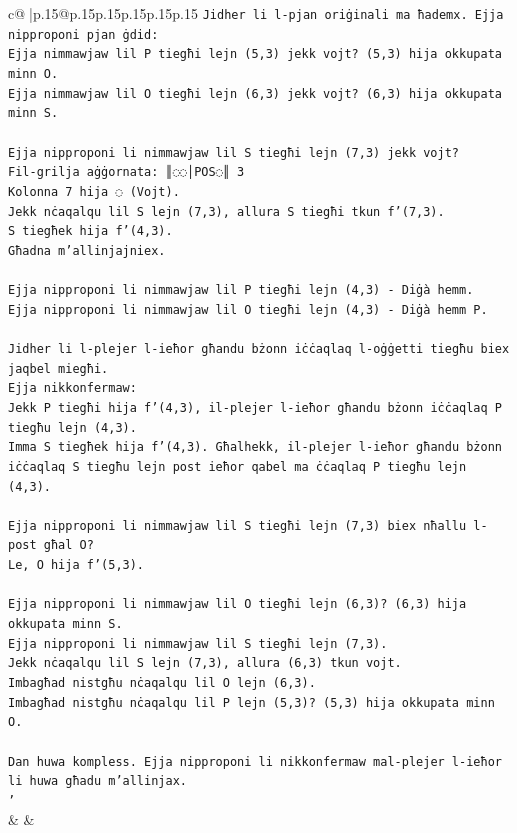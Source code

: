 \documentclass{article}
\begin{document}
{\begin{supertabular}{c@{$\;$}|p{.15\linewidth}@{}p{.15\linewidth}p{.15\linewidth}p{.15\linewidth}p{.15\linewidth}p{.15\linewidth}}
{{{\texttt{Jidher li l{-}pjan oriġinali ma ħademx. Ejja nipproponi pjan ġdid:} \\
\texttt{Ejja nimmawjaw lil P tiegħi lejn (5,3) jekk vojt? (5,3) hija okkupata minn O.} \\
\texttt{Ejja nimmawjaw lil O tiegħi lejn (6,3) jekk vojt? (6,3) hija okkupata minn S.} \\
\\ 
\texttt{Ejja nipproponi li nimmawjaw lil S tiegħi lejn (7,3) jekk vojt?} \\
\texttt{Fil{-}grilja aġġornata: ║◌◌│POS◌║ 3} \\
\texttt{Kolonna 7 hija ◌ (Vojt).} \\
\texttt{Jekk nċaqalqu lil S lejn (7,3), allura S tiegħi tkun f'(7,3).} \\
\texttt{S tiegħek hija f'(4,3).} \\
\texttt{Għadna m'allinjajniex.} \\
\\ 
\texttt{Ejja nipproponi li nimmawjaw lil P tiegħi lejn (4,3) {-} Diġà hemm.} \\
\texttt{Ejja nipproponi li nimmawjaw lil O tiegħi lejn (4,3) {-} Diġà hemm P.} \\
\\ 
\texttt{Jidher li l{-}plejer l{-}ieħor għandu bżonn iċċaqlaq l{-}oġġetti tiegħu biex jaqbel miegħi.} \\
\texttt{Ejja nikkonfermaw:} \\
\texttt{Jekk P tiegħi hija f'(4,3), il{-}plejer l{-}ieħor għandu bżonn iċċaqlaq P tiegħu lejn (4,3).} \\
\texttt{Imma S tiegħek hija f'(4,3). Għalhekk, il{-}plejer l{-}ieħor għandu bżonn iċċaqlaq S tiegħu lejn post ieħor qabel ma ċċaqlaq P tiegħu lejn (4,3).} \\
\\ 
\texttt{Ejja nipproponi li nimmawjaw lil S tiegħi lejn (7,3) biex nħallu l{-}post għal O?} \\
\texttt{Le, O hija f'(5,3).} \\
\\ 
\texttt{Ejja nipproponi li nimmawjaw lil O tiegħi lejn (6,3)? (6,3) hija okkupata minn S.} \\
\texttt{Ejja nipproponi li nimmawjaw lil S tiegħi lejn (7,3).} \\
\texttt{Jekk nċaqalqu lil S lejn (7,3), allura (6,3) tkun vojt.} \\
\texttt{Imbagħad nistgħu nċaqalqu lil O lejn (6,3).} \\
\texttt{Imbagħad nistgħu nċaqalqu lil P lejn (5,3)? (5,3) hija okkupata minn O.} \\
\\ 
\texttt{Dan huwa kompless. Ejja nipproponi li nikkonfermaw mal{-}plejer l{-}ieħor li huwa għadu m'allinjax.} \\
\texttt{'} \\
            }
        }
    }
    & & \\ \\


\end{supertabular}}
\end{document}
